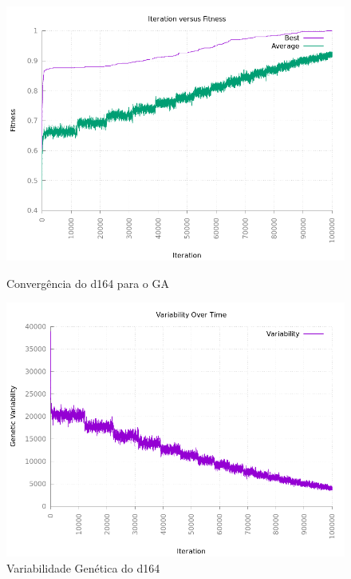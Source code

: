 \documentclass[12pt]{article}
\begin{document}
\begin{figure}[h!]
    \centering
    \begin{minipage}{0.45\textwidth}
        \centering
        \includegraphics[width=\textwidth]{pictures/d164convergence}
        \caption{Convergência do d164 para o GA}
    \end{minipage}
    \begin{minipage}{0.45\textwidth}
        \centering
        \includegraphics[width=\textwidth]{pictures/d164variability}
        \caption{Variabilidade Genética do d164}
    \end{minipage}
\end{figure}
\end{document}
